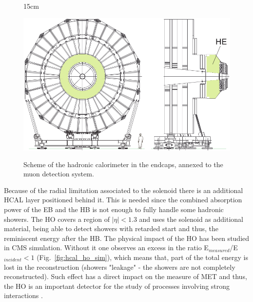 \begin{figure}[htbp]{15cm}
\caption{Scheme of the hadronic calorimeter in the endcaps, annexed to the muon detection system.}
\includegraphics[scale=0.4]{ChapterCMS/figs/hcal_he.png}
\label{fig:hcal_he}
\end{figure}

Because of the radial limitation associated to the solenoid there is an additional HCAL layer positioned behind it. This is needed since the combined absorption power of the EB and the HB is not enough to fully handle some hadronic showers. The HO covers a region of $|\eta| < 1.3$ and uses the solenoid as additional material, being able to detect showers with retarded start and thus, the reminiscent energy after the HB. The physical impact of the HO has been studied in CMS simulation. Without it one observes an excess in the ratio E$_{measured}$/E$_{incident} < 1$ (Fig.~\ref{fig:hcal_ho_sim}), which means that, part of the total energy is lost in the reconstruction (showers "leakage" - the showers are not completely reconstructed). Such effect has a direct impact on the measure of MET and thus, the HO is an important detector for the study of processes involving strong interactions \cite{bib:JINST-3-362-2008,bib:hcal-tdr-1997}.

